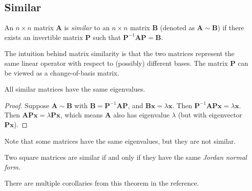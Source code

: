 \subsection{Similar}
\begin{definition}[Similar]
  An $n\times n$ matrix $\bm{A}$ is \emph{similar} to an $n\times n$ matrix $\bm{B}$ (denoted as $\bm{A}\sim \bm{B}$) if there exists an invertible matrix $\bm{P}$ such that $\bm{P}^{-1}\bm{A}\bm{P}=\bm{B}$.
\end{definition}

The intuition behind matrix similarity is that the two matrices represent the same linear operator with respect to (possibly) different bases. The matrix $\bm{P}$ can be viewed as a change-of-basis matrix. 

\begin{theorem}
  All similar matrices have the same eigenvalues. \\
\end{theorem}
  \begin{proof}
    Suppose $\bm{A}\sim \bm{B}$ with $\bm{B}=\bm{P}^{-1}\bm{AP}$, and $\bm{B}\bm{x}=\lambda\bm{x}$. Then $\bm{P}^{-1}\bm{APx}=\lambda\bm{x}$. Then $\bm{APx}=\lambda\bm{P}\bm{x}$, which means $\bm{A}$ also has eigenvalue $\lambda$ (but with eigenvector $\bm{Px}$).
  \end{proof}
  \noindent Note that some matrices have the same eigenvalues, but they are not similar.
  
\begin{theorem}
  Two square matrices are similar if and only if they have the same \emph{Jordan normal form}.
\end{theorem}
\noindent There are multiple corollaries from this theorem in the reference.



